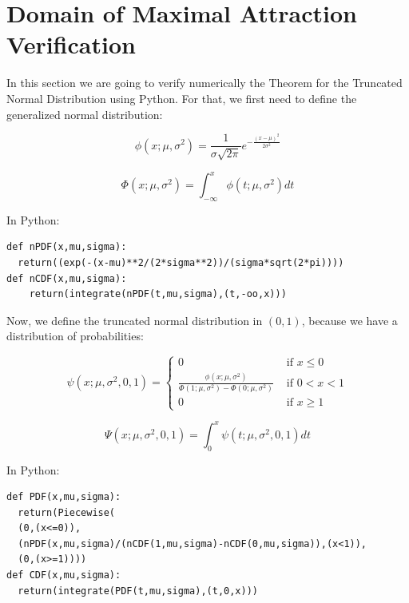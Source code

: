 \chapter{Domain of Maximal Attraction Verification}
\label{ap:theoremVer}

In this section we are going to verify numerically the Theorem for the Truncated Normal Distribution using Python. For that, we first need to define the generalized normal distribution:

\begin{equation} \label{eq:Normal_PDF}
\phi (x; \mu, \sigma^2) = \frac{1}{\sigma \sqrt{2 \pi}} e^{-\frac{\left( x - \mu \right)^2}{2\sigma^2}}
\end{equation}

\begin{equation} \label{eq:Normal_CDF}
\Phi (x; \mu, \sigma^2) = \int_{-\infty} ^x \phi (t;\mu,\sigma^2) dt
\end{equation}

In Python:

\begin{verbatim}
def nPDF(x,mu,sigma):
  return((exp(-(x-mu)**2/(2*sigma**2))/(sigma*sqrt(2*pi))))
def nCDF(x,mu,sigma):
    return(integrate(nPDF(t,mu,sigma),(t,-oo,x)))
\end{verbatim}

Now, we define the truncated normal distribution in $(0,1)$, because we have a distribution of probabilities:

\begin{equation} \label{eq:TNormal_PDF}
\psi (x; \mu, \sigma^2,0,1) = 
\begin{cases}
0 & \text{ if } x \leq 0 \\
\frac{\phi(x;\mu, \sigma^2)}{\Phi (1; \mu, \sigma^2)-\Phi (0; \mu, \sigma^2)} & \text{ if } 0 < x < 1 \\
0 & \text{ if } x \geq 1
\end{cases}
\end{equation}

\begin{equation} \label{eq:TNormal_CDF}
\Psi (x; \mu, \sigma^2,0,1) = \int_{0} ^x \psi (t;\mu,\sigma^2,0,1) dt
\end{equation}

In Python:

\begin{verbatim}
def PDF(x,mu,sigma):
  return(Piecewise(
  (0,(x<=0)),
  (nPDF(x,mu,sigma)/(nCDF(1,mu,sigma)-nCDF(0,mu,sigma)),(x<1)),
  (0,(x>=1))))
def CDF(x,mu,sigma):
  return(integrate(PDF(t,mu,sigma),(t,0,x)))
\end{verbatim}

